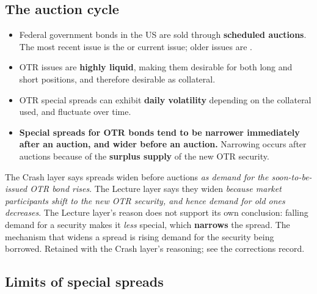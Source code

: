 \subsection{The auction cycle}

\begin{itemize}
\item Federal government bonds in the US are sold through \textbf{scheduled auctions}. The most recent issue is the  or current issue; older issues are .
\item OTR issues are \textbf{highly liquid}, making them desirable for both long and short positions, and therefore desirable as collateral.
\item OTR special spreads can exhibit \textbf{daily volatility} depending on the collateral used, and fluctuate over time.
\item \textbf{Special spreads for OTR bonds tend to be narrower immediately after an auction, and wider before an auction.} Narrowing occurs after auctions because of the \textbf{surplus supply} of the new OTR security.
\end{itemize}

\begin{lrtrapbox}
The Crash layer says spreads widen before auctions \emph{as demand for the soon-to-be-issued OTR bond rises}. The Lecture layer says they widen \emph{because market participants shift to the new OTR security, and hence demand for old ones decreases}. The Lecture layer's reason does not support its own conclusion: falling demand for a security makes it \emph{less} special, which \textbf{narrows} the spread. The mechanism that widens a spread is rising demand for the security being borrowed. Retained with the Crash layer's reasoning; see the corrections record.
\end{lrtrapbox}

\subsection{Limits of special spreads}

